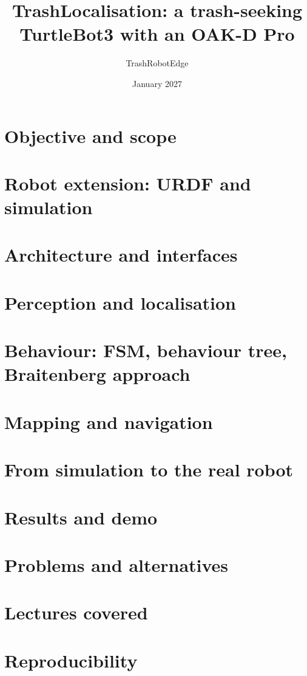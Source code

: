 \documentclass[11pt,a4paper]{article}
\title{TrashLocalisation: a trash-seeking TurtleBot3 with an OAK-D Pro}
\author{TrashRobotEdge}
\date{January 2027}
\begin{document}
\maketitle

\section{Objective and scope}            %
\section{Robot extension: URDF and simulation} %
\section{Architecture and interfaces}    %
\section{Perception and localisation}    %
\section{Behaviour: FSM, behaviour tree, Braitenberg approach} %
\section{Mapping and navigation}         %
\section{From simulation to the real robot} %
\section{Results and demo}               %
\section{Problems and alternatives}      %
\section{Lectures covered}               %
\section{Reproducibility}                %
\end{document}
